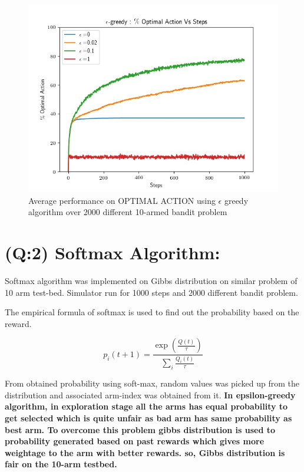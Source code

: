\documentclass[preprint,12pt]{elsarticle}
\begin{document}
	 
	 \begin{figure}[H]
	 	\centering
	 	\includegraphics[scale=0.7]{./optimal_epsilon.jpg}
	 	\hspace{0.25cm}
	 	\caption{Average performance on OPTIMAL ACTION using $\epsilon$ greedy algorithm over 2000 different 10-armed bandit problem}
	 	\label{fig2:greedy_opt}
	 \end{figure}
	 
	 \newpage
	 
 	\section{(Q:2)  Softmax Algorithm:}
 	\label{S:2}
 	
 	Softmax algorithm was implemented on Gibbs distribution on similar problem of 10 arm test-bed. Simulator run for 1000 steps and 2000 different bandit problem. 
 	
 	The empirical formula of softmax is used to find out the probability based on the reward.
 	
 	\begin{equation}
 		p_{i} (t+1)=  \frac{\exp({\frac{Q(t)}{\tau}})}{\sum_{i} \frac{Q_i(t)}{\tau} }
 	\end{equation}
 	
 	 From obtained probability using soft-max, random values was picked up from the distribution and associated arm-index was obtained from it.\textbf{ In epsilon-greedy algorithm, in exploration stage all the arms has equal probability to get selected which is quite unfair as bad arm has same probability as best arm. To overcome this problem gibbs distribution is used to probability generated based on past rewards which gives more weightage to the arm with better rewards. so, Gibbs distribution is fair on the 10-arm testbed.}
 	 
\end{document}
